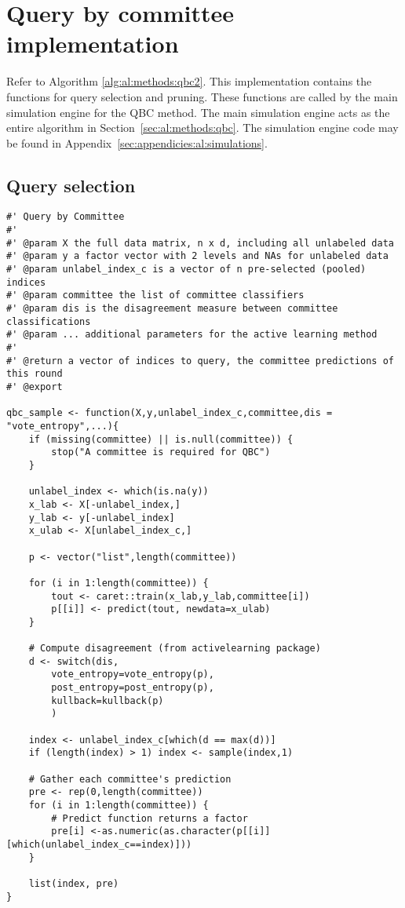 \section{Query by committee implementation}
\label{sec:appendicies:al:qbc}

Refer to Algorithm \ref{alg:al:methods:qbc2}. 
This implementation contains the functions for query selection and pruning. 
These functions are called by the main simulation engine for the QBC method. 
The main simulation engine acts as the entire algorithm in 
Section~\ref{sec:al:methods:qbc}. The simulation engine code may be found in 
Appendix~\ref{sec:appendicies:al:simulations}.
\subsection{Query selection}
{
\begin{lstlisting}
#' Query by Committee
#'
#' @param X the full data matrix, n x d, including all unlabeled data
#' @param y a factor vector with 2 levels and NAs for unlabeled data
#' @param unlabel_index_c is a vector of n pre-selected (pooled) indices
#' @param committee the list of committee classifiers
#' @param dis is the disagreement measure between committee classifications
#' @param ... additional parameters for the active learning method
#'
#' @return a vector of indices to query, the committee predictions of this round
#' @export

qbc_sample <- function(X,y,unlabel_index_c,committee,dis = "vote_entropy",...){
	if (missing(committee) || is.null(committee)) {
		stop("A committee is required for QBC")
	}
	
	unlabel_index <- which(is.na(y))
	x_lab <- X[-unlabel_index,]
	y_lab <- y[-unlabel_index]
	x_ulab <- X[unlabel_index_c,]
	
	p <- vector("list",length(committee))
	
	for (i in 1:length(committee)) {
		tout <- caret::train(x_lab,y_lab,committee[i])
		p[[i]] <- predict(tout, newdata=x_ulab)
	}
	
	# Compute disagreement (from activelearning package)
	d <- switch(dis,
		vote_entropy=vote_entropy(p),
		post_entropy=post_entropy(p),
		kullback=kullback(p)
		)
	
	index <- unlabel_index_c[which(d == max(d))]
	if (length(index) > 1) index <- sample(index,1)
	
	# Gather each committee's prediction
	pre <- rep(0,length(committee))
	for (i in 1:length(committee)) {
		# Predict function returns a factor
		pre[i] <-as.numeric(as.character(p[[i]][which(unlabel_index_c==index)]))
	}
	
	list(index, pre)
}
\end{lstlisting}
}
